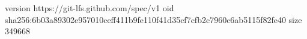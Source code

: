version https://git-lfs.github.com/spec/v1
oid sha256:6b03a89302e957010ceff411b9fe110f41d35cf7cfb2c7960c6ab5115f82fe40
size 349668

